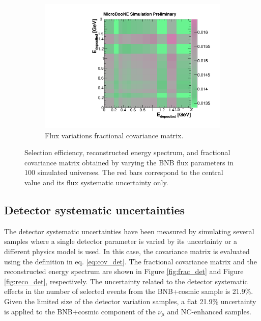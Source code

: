 \begin{figure}[htbp]
\begin{center}
\begin{subfigure}{0.45\textwidth}
      \includegraphics[width=\linewidth]{figures/frac_flux.pdf}
      \caption{Flux variations fractional covariance matrix.}  \label{fig:frac_flux}
    \end{subfigure}
    	\caption{Selection efficiency, reconstructed energy spectrum, and fractional covariance matrix obtained by varying the BNB flux parameters in 100 simulated universes.  The red bars correspond to the central value and its flux systematic uncertainty only.} \label{fig:flux_sys}
	\end{center}
\end{figure}

\subsection{Detector systematic uncertainties}
The detector systematic uncertainties have been measured by simulating several samples where a single detector parameter is varied by its uncertainty or a different physics model is used. In this case, the covariance matrix is evaluated using the definition in eq. \eqref{eq:cov_det}. The fractional covariance matrix and the reconstructed energy spectrum are shown in Figure \ref{fig:frac_det} and Figure \ref{fig:reco_det}, respectively.
The uncertainty related to the detector systematic effects in the number of selected events from the BNB+cosmic sample is 21.9\%. Given the limited size of the detector variation samples, a flat 21.9\% uncertainty is applied to the BNB+cosmic component of the $\nu_{\mu}$ and NC-enhanced samples.

